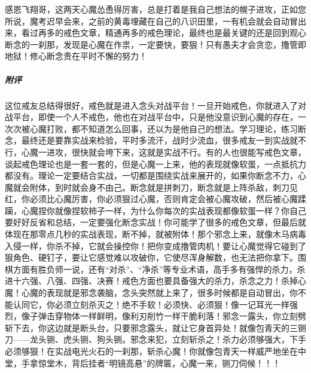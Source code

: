 \begin{case}
    感恩飞翔哥，这两天心魔怂恿得厉害，总是打着是我自己想法的幌子进攻，正如您所说，魔考迟早会来，之前的黄毒埋藏在自己的八识田里，一有机会就会自动冒出来，看过再多的戒色文章，精通再多的戒色理论，最终也是最关键的还是回到观心断念的一刹那，发现是心魔在作祟，一定要快，要狠！只有愚夫才会贪恋，撸管即地狱！修心断念贵在平时不懈的努力！
    \subparagraph{附评} 这位戒友总结得很好，戒色就是进入念头对战平台！一旦开始戒色，你就进入了对战平台，即使一个人不戒色，他也在对战平台中，只是他没意识到心魔的存在，一次次被心魔打败，都不知道怎么回事，还以为是他自己的想法。学习理论，练习断念，最终还是要靠实战来检验，平时多流汗，战时少流血，很多戒友一到实战就不行，心魔一进攻，很快就会垮下来，这就是实战不行。有的人也很能写戒色文章，谈起戒色理论也是一套一套的，但是心魔一上来，他的表现就像软蛋，一点抵抗力都没有。理论一定要结合实战，一切都是围绕实战来展开的，如果你断念不力，心魔就会附体，到时就会身不由己。断念就是拼刺刀，断念就是上阵杀敌，刺刀见红，你必须比心魔厉害，你必须狠过心魔，否则肯定会被心魔攻破，然后被心魔蹂躏，心魔捏你就像捏软柿子一样，为什么你每次的实战表现都像软蛋一样？你自己要好好反省和总结，一定要强化断念实战！你可能学了很多的戒色文章，但最后就体现在那零点几秒的实战表现，断不掉，就被附体！那个邪念上来，就像木马病毒入侵一样，你杀不掉，它就会操控你！把你变成撸管肉机！要让心魔觉得它碰到了狠角色、硬钉子，要让它感觉难以攻破你，它使尽浑身解数，也无法把你拿下。围棋方面有胜负师一说，还有“对杀”、“净杀”等专业术语，高手多有强悍的杀力，杀进十六强、八强、四强、决赛！戒色方面也要具备强大的杀力，杀念之力！杀掉心魔！心魔的表现就是邪念袭脑，念头突然就上来了，很多时候都是自动冒出，你不能认同它，你必须立刻杀灭之！绝不手软！必须快、必须狠！像一记耳光一样强烈，像子弹击穿物体一样鲜明，像利刃削竹一样干脆利落！邪念一露头，你立刻劈斩下去，你这边就是断头台，只要邪念露头，就让它身首异处！就像包青天的三铡刀——龙头铡、虎头铡、狗头铡。邪念来犯，立刻斩杀之！杀力必须够强大，下手必须够狠！在实战电光火石的一刹那，斩杀心魔！你就像包青天一样威严地坐在中堂，手拿惊堂木，背后挂者“明镜高悬”的牌匾，心魔一来，铡刀伺候！！！
\end{case}

